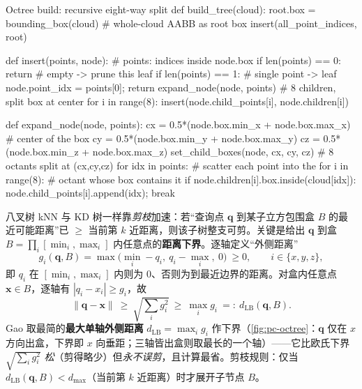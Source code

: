 \begin{algo}\label{alg:pc-octree-build}
\begin{codebox}[Python]{Octree build: recursive eight-way split}
def build_tree(cloud):
    root.box = bounding_box(cloud)       # whole-cloud AABB as root box
    insert(all_point_indices, root)

def insert(points, node):                # points: indices inside node.box
    if len(points) == 0: return           # empty -> prune this leaf
    if len(points) == 1:                  # single point -> leaf
        node.point_idx = points[0]; return
    expand_node(node, points)             # 8 children, split box at center
    for i in range(8):
        insert(node.child_points[i], node.children[i])

def expand_node(node, points):
    cx = 0.5*(node.box.min_x + node.box.max_x)    # center of the box
    cy = 0.5*(node.box.min_y + node.box.max_y)
    cz = 0.5*(node.box.min_z + node.box.max_z)
    set_child_boxes(node, cx, cy, cz)     # 8 octants split at (cx,cy,cz)
    for idx in points:                    # scatter each point into the
        for i in range(8):               #   octant whose box contains it
            if node.children[i].box.inside(cloud[idx]):
                node.child_points[i].append(idx); break
\end{codebox}
\end{algo}

\begin{derivation}
八叉树 kNN 与 KD 树一样靠\emph{剪枝}加速：若“查询点 $\mathbf{q}$ 到某子立方包围盒 $B$ 的最近可能距离”已 $\ge$ 当前第 $k$ 近距离，则该子树整支可剪。关键是给出 $\mathbf{q}$ 到盒 $B=\prod_i[\min_i,\max_i]$ 内任意点的\textbf{距离下界}。逐轴定义“外侧距离”
\begin{equation}
  g_i(\mathbf{q},B)=\max\big(\min_i-q_i,\ q_i-\max_i,\ 0\big)\ \ge 0,\qquad i\in\{x,y,z\},
  \label{eq:pc-octree-gap}
\end{equation}
即 $q_i$ 在 $[\min_i,\max_i]$ 内则为 $0$、否则为到最近边界的距离。对盒内任意点 $\mathbf{x}\in B$，逐轴有 $|q_i-x_i|\ge g_i$，故
\begin{equation}
  \|\mathbf{q}-\mathbf{x}\|\ \ge\ \sqrt{\textstyle\sum_i g_i^2}\ \ge\ \max_i g_i\ =:\ d_{\mathrm{LB}}(\mathbf{q},B).
  \label{eq:pc-octree-boxdist}
\end{equation}
Gao 取最简的\textbf{最大单轴外侧距离} $d_{\mathrm{LB}}=\max_i g_i$ 作下界（\cref{fig:pc-octree}：$\mathbf{q}$ 仅在 $x$ 方向出盒，下界即 $x$ 向垂距；三轴皆出盒则取最长的一个轴）——它比欧氏下界 $\sqrt{\sum_i g_i^2}$ \emph{松}（剪得略少）但\emph{永不误剪}，且计算最省\cite{gao2023slamad}。剪枝规则：仅当 $d_{\mathrm{LB}}(\mathbf{q},B)<d_{\max}$（当前第 $k$ 近距离）时才展开子节点 $B$。
\end{derivation}

